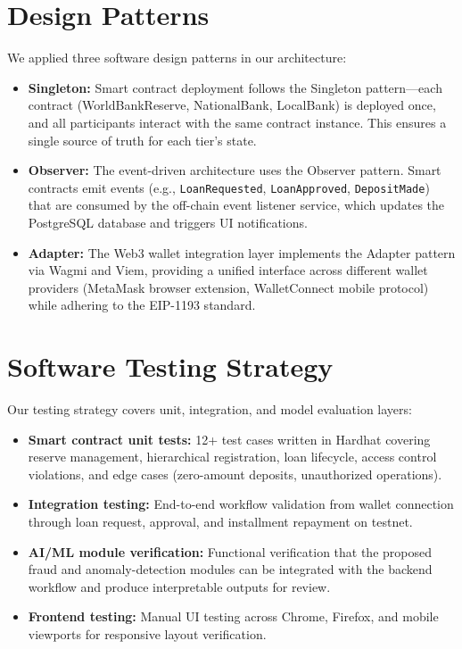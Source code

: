 \documentclass[12pt,a4paper]{report}
\begin{document}
\section{Design Patterns}

We applied three software design patterns in our architecture:

\begin{itemize}[noitemsep]
\item \textbf{Singleton:} Smart contract deployment follows the Singleton pattern---each contract (WorldBankReserve, NationalBank, LocalBank) is deployed once, and all participants interact with the same contract instance. This ensures a single source of truth for each tier's state.

\item \textbf{Observer:} The event-driven architecture uses the Observer pattern. Smart contracts emit events (e.g., \texttt{LoanRequested}, \texttt{LoanApproved}, \texttt{DepositMade}) that are consumed by the off-chain event listener service, which updates the PostgreSQL database and triggers UI notifications.

\item \textbf{Adapter:} The Web3 wallet integration layer implements the Adapter pattern via Wagmi and Viem, providing a unified interface across different wallet providers (MetaMask browser extension, WalletConnect mobile protocol) while adhering to the EIP-1193 standard.
\end{itemize}


\section{Software Testing Strategy}

Our testing strategy covers unit, integration, and model evaluation layers:

\begin{itemize}[noitemsep]
\item \textbf{Smart contract unit tests:} 12+ test cases written in Hardhat covering reserve management, hierarchical registration, loan lifecycle, access control violations, and edge cases (zero-amount deposits, unauthorized operations).
\item \textbf{Integration testing:} End-to-end workflow validation from wallet connection through loan request, approval, and installment repayment on testnet.
\item \textbf{AI/ML module verification:} Functional verification that the proposed fraud and anomaly-detection modules can be integrated with the backend workflow and produce interpretable outputs for review.
\item \textbf{Frontend testing:} Manual UI testing across Chrome, Firefox, and mobile viewports for responsive layout verification.
\end{itemize}
\end{document}
